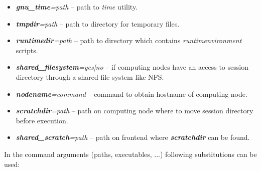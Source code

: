 \documentclass{article}                            %
\begin{document}
\begin{itemize}
\item \textbf{\textit{gnu\_time}}\textit{=path} -- path to \emph{time}
  utility.
\item \textbf{\textit{tmpdir}}\textit{=path} -- path to directory for temporary
files.
\item \textbf{\textit{runtimedir}}\textit{=path} -- path to directory which
contains \emph{runtimenvironment} scripts.
\item \textbf{\textit{shared\_filesystem}}\textit{=yes|no} -- if computing
nodes have an access to session directory through a shared file system
like NFS. 
\item \textbf{\textit{nodename}}\textit{=command} -- command to obtain hostname
of computing node.
\item \textbf{\textit{scratchdir}}\textit{=path} -- path on computing node
where to move session directory before execution.
\item \textbf{\textit{shared\_scratch}}\textit{=path} -- path on frontend
where \textbf{\textit{scratchdir}} can be found.
\end{itemize}

In the command arguments (paths, executables, ...) following substitutions
can be used:
\end{document}
